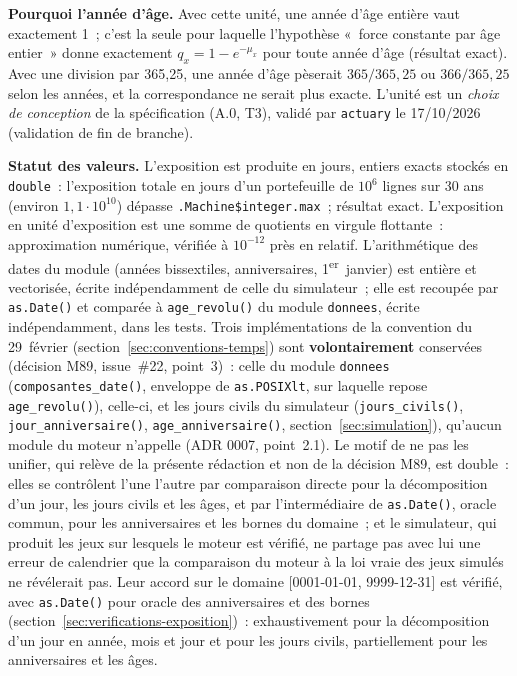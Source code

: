\documentclass[a4paper,11pt]{article}
\newcommand{\code}[1]{\texttt{\small #1}}
\begin{document}
\noindent
\textbf{Pourquoi l'année d'âge.} Avec cette unité, une année d'âge entière
vaut exactement 1~; c'est la seule pour laquelle l'hypothèse «~force constante
par âge entier~» donne exactement $q_x = 1 - e^{-\mu_x}$ pour toute année
d'âge (résultat exact). Avec une division par 365,25, une année d'âge pèserait
$365/365{,}25$ ou $366/365{,}25$ selon les années, et la correspondance ne
serait plus exacte. L'unité est un \emph{choix de conception} de la
spécification (A.0, T3), validé par \code{actuary} le 17/10/2026 (validation
de fin de branche).

\medskip
\textbf{Statut des valeurs.} L'exposition est produite en jours, entiers
exacts stockés en \code{double}~: l'exposition totale en jours d'un
portefeuille de $10^{6}$ lignes sur 30 ans (environ $1{,}1\cdot 10^{10}$)
dépasse \code{.Machine\$integer.max}~; résultat exact.
L'exposition en unité d'exposition est une somme de quotients en virgule
flottante~: approximation numérique, vérifiée à $10^{-12}$ près en relatif.
L'arithmétique des dates du module (années bissextiles, anniversaires,
1\textsuperscript{er}~janvier) est entière et vectorisée, écrite
indépendamment de celle du simulateur~; elle est recoupée par \code{as.Date()}
et comparée à \code{age\_revolu()} du module \code{donnees}, écrite
indépendamment, dans les tests. Trois implémentations de la convention du
29~février (section~\ref{sec:conventions-temps}) sont
\textbf{volontairement} conservées (décision M89, issue~\#22, point~3)~: celle du module
\code{donnees} (\code{composantes\_date()}, enveloppe de \code{as.POSIXlt},
sur laquelle repose \code{age\_revolu()}), celle-ci, et les jours civils du
simulateur (\code{jours\_civils()}, \code{jour\_anniversaire()},
\code{age\_anniversaire()}, section~\ref{sec:simulation}), qu'aucun module
du moteur n'appelle (ADR 0007, point~2.1). Le motif de ne pas les unifier,
qui relève de la présente rédaction et non de la décision M89, est double~:
elles se contrôlent l'une l'autre par comparaison directe pour la
décomposition d'un jour, les jours civils et les âges, et par l'intermédiaire
de \code{as.Date()}, oracle commun, pour les anniversaires et les bornes du
domaine~; et le simulateur, qui produit les
jeux sur lesquels le moteur est vérifié, ne partage pas avec lui une erreur
de calendrier que la comparaison du moteur à la loi vraie des jeux simulés
ne révélerait pas. Leur accord sur le
domaine [0001-01-01, 9999-12-31] est vérifié, avec \code{as.Date()} pour
oracle des anniversaires et des bornes (section~\ref{sec:verifications-exposition})~: exhaustivement pour
la décomposition d'un jour en année, mois et jour et pour les jours civils,
partiellement pour les anniversaires et les âges.
\end{document}
